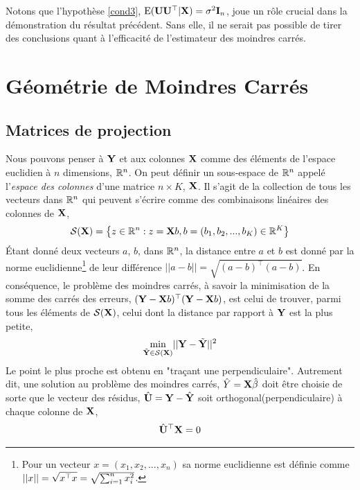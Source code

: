 Notons que l'hypothèse \eqref{cond3}, $\operatorname{E}(\mathbf U\mathbf U^\top|\mathbf X )=\sigma^2\mathbf{I}_n$, joue un rôle crucial dans la démonstration du résultat précédent. Sans elle, il ne serait pas possible de tirer des conclusions quant à  l'efficacité de l'estimateur des moindres carrés.


\newpage

\section{Géométrie de Moindres Carrés}

\subsection{Matrices de projection}
Nous pouvons penser à $\mathbf Y$ et aux colonnes $\mathbf X$ comme des éléments de l'espace euclidien à $n$ dimensions, $\mathbb{R}^n$. On peut définir un sous-espace de $\mathbb{R}^n$ appelé l'\emph{espace des colonnes} d'une matrice $n\times K$, $\mathbf X$. Il s'agit de la collection de tous les vecteurs dans $\mathbb{R}^n$ qui peuvent s'écrire comme des combinaisons linéaires des colonnes de $\mathbf X$,
\begin{align*}
\mathcal{S}(\mathbf X) = \left\{z \in \mathbb{R}^n: z = \mathbf X b, b = (b_1, b_2,...,b_K) \in \mathbb{R}^K  \right\}
\end{align*}
\'Etant donné deux vecteurs $a$, $b$, dans $\mathbb{R}^n$, la distance entre $a$ et $b$ est donné par la norme euclidienne\footnote{Pour un vecteur $x=(x_1, x_2,...,x_n)$ sa norme euclidienne est définie comme $||x|| = \sqrt{x^\top x} = \sqrt{\sum_{i=1}^n x_i^2}$.} de leur différence $||a-b|| = \sqrt{(a-b)^\top(a-b)}$. En conséquence, le problème des moindres carrés, à savoir la minimisation de la somme des carrés des erreurs, $(\mathbf Y-\mathbf X b)^\top(\mathbf Y-\mathbf X b)$, est celui de trouver, parmi tous les éléments de $\mathcal{S}(\mathbf X)$, celui dont la distance par rapport à $\mathbf Y$ est la plus petite,
\begin{align*}
\underset{\tilde{\mathbf Y}\in \mathcal{S}(\mathbf X)}{\min} ||\mathbf Y - \tilde{\mathbf Y}||^2
\end{align*}
Le point le plus proche est obtenu en "traçant une perpendiculaire". Autrement dit, une solution au problème des moindres carrés, $\hat{Y} = \mathbf X\hat{\beta}$ doit être choisie de sorte que le vecteur des résidus, $\hat{\mathbf U} = \mathbf Y-\hat{\mathbf Y}$ soit orthogonal(perpendiculaire) à chaque colonne de $\mathbf X$,
\begin{align*}
\hat{\mathbf U}^\top\mathbf X = 0
\end{align*}

